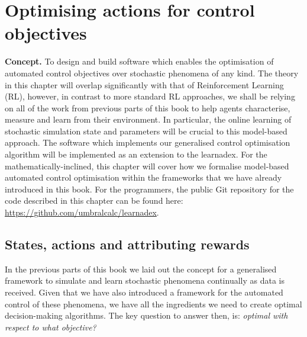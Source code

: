 \chapter{\sffamily Optimising actions for control objectives}

{\bfseries\sffamily Concept.} To design and build software which enables the optimisation of automated control objectives over stochastic phenomena of any kind. The theory in this chapter will overlap significantly with that of Reinforcement Learning (RL), however, in contrast to more standard RL approaches, we shall be relying on all of the work from previous parts of this book to help agents characterise, measure and learn from their environment. In particular, the online learning of stochastic simulation state and parameters will be crucial to this model-based approach. The software which implements our generalised control optimisation algorithm will be implemented as an extension to the learnadex. For the mathematically-inclined, this chapter will cover how we formalise model-based automated control optimisation within the frameworks that we have already introduced in this book. For the programmers, the public Git repository for the code described in this chapter can be found here: \href{https://github.com/umbralcalc/learnadex}{https://github.com/umbralcalc/learnadex}.

\section{\sffamily States, actions and attributing rewards}

In the previous parts of this book we laid out the concept for a generalised framework to simulate and learn stochastic phenomena continually as data is received. Given that we have also introduced a framework for the automated control of these phenomena, we have all the ingredients we need to create optimal decision-making algorithms. The key question to answer then, is: \emph{optimal with respect to what objective?}

